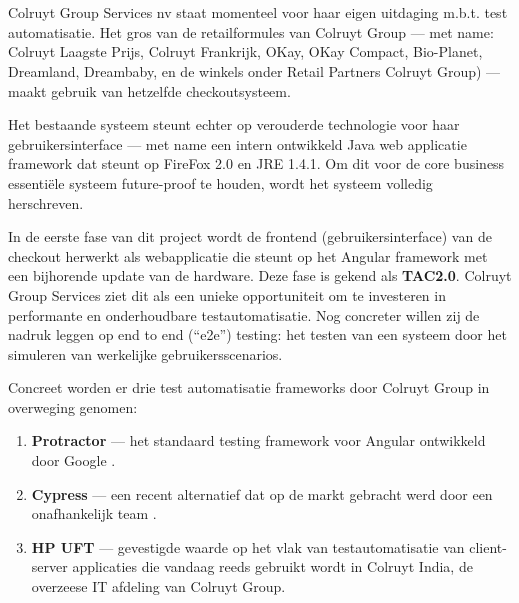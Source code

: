 \section{}
\label{sec:probleemstelling}

Colruyt Group Services nv staat momenteel voor haar eigen uitdaging m.b.t. test automatisatie. Het gros van de retailformules van Colruyt Group — met name: Colruyt Laagste Prijs, Colruyt Frankrijk, OKay, OKay Compact, Bio-Planet, Dreamland, Dreambaby, en de winkels onder Retail Partners Colruyt Group) — maakt gebruik van hetzelfde checkoutsysteem.

Het bestaande systeem steunt echter op verouderde technologie voor haar gebruikersinterface — met name een intern ontwikkeld Java web applicatie framework dat steunt op FireFox 2.0 en JRE 1.4.1. Om dit voor de core business essentiële systeem future-proof te houden, wordt het systeem volledig herschreven.

In de eerste fase van dit project wordt de frontend (gebruikersinterface) van de checkout herwerkt als webapplicatie die steunt op het Angular framework met een bijhorende update van de hardware. Deze fase is gekend als \textbf{TAC2.0}. Colruyt Group Services ziet dit als een unieke opportuniteit om te investeren in performante en onderhoudbare testautomatisatie. Nog concreter willen zij de nadruk leggen op end to end (``e2e'') testing: het testen van een systeem door het simuleren van werkelijke gebruikersscenarios.

Concreet worden er drie test automatisatie frameworks door Colruyt Group in overweging genomen:

\begin{enumerate}
    \item \textbf{Protractor} — het standaard testing framework voor Angular ontwikkeld door Google \autocite{Amorim2014}.
    \item \textbf{Cypress} — een recent alternatief dat op de markt gebracht werd door een onafhankelijk team \autocite{Mann2017}.
    \item \textbf{HP UFT} — gevestigde waarde op het vlak van testautomatisatie van client-server applicaties \autocite{Swati2020} die vandaag reeds gebruikt wordt in Colruyt India, de overzeese IT afdeling van Colruyt Group.
\end{enumerate}


\section{}
\label{sec:onderzoeksvraag}

